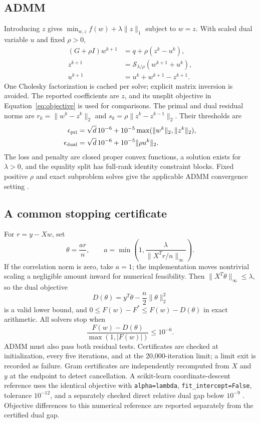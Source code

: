 \documentclass{article}
\newcommand{\soft}{\mathcal{S}}
\begin{document}
\subsection{ADMM}
Introducing $z$ gives $\min_{w,z} f(w)+\lambda\|z\|_1$ subject to $w=z$. With scaled dual variable $u$ and fixed $\rho>0$,
\begin{align}
 (G+\rho I)w^{k+1}&=q+\rho(z^k-u^k),\\
 z^{k+1}&=\soft_{\lambda/\rho}(w^{k+1}+u^k),\\
 u^{k+1}&=u^k+w^{k+1}-z^{k+1}.
\end{align}
One Cholesky factorization is cached per solve; explicit matrix inversion is avoided. The reported coefficients are $z$, and its unsplit objective in Equation~\ref{eq:objective} is used for comparisons. The primal and dual residual norms are
$r_k=\|w^k-z^k\|_2$ and $s_k=\rho\|z^k-z^{k-1}\|_2$.
Their thresholds are
\begin{align}
 \epsilon_{\rm pri}&=\sqrt{d}\,10^{-6}+10^{-5}\max(\|w^k\|_2,\|z^k\|_2),\\
 \epsilon_{\rm dual}&=\sqrt{d}\,10^{-6}+10^{-5}\|\rho u^k\|_2.
\end{align}
The loss and penalty are closed proper convex functions, a solution exists for $\lambda>0$, and the equality split has full-rank identity constraint blocks. Fixed positive $\rho$ and exact subproblem solves give the applicable ADMM convergence setting \citep{boyd2011}.

\subsection{A common stopping certificate}
For $r=y-Xw$, set
\begin{equation}
 \theta=\frac{a r}{n},\qquad
 a=\min\left(1,\frac{\lambda}{\|X^Tr/n\|_\infty}\right).
\end{equation}
If the correlation norm is zero, take $a=1$; the implementation moves nontrivial scaling a negligible amount inward for numerical feasibility. Then $\|X^T\theta\|_\infty\leq\lambda$, so the dual objective
\begin{equation}
 D(\theta)=y^T\theta-\frac{n}{2}\|\theta\|_2^2
\end{equation}
is a valid lower bound, and $0\leq F(w)-F^*\leq F(w)-D(\theta)$ in exact arithmetic. All solvers stop when
\begin{equation}
 \frac{F(w)-D(\theta)}{\max(1,|F(w)|)}\leq10^{-6}.
 \label{eq:stopping}
\end{equation}
ADMM must also pass both residual tests. Certificates are checked at initialization, every five iterations, and at the 20,000-iteration limit; a limit exit is recorded as failure. Gram certificates are independently recomputed from $X$ and $y$ at the endpoint to detect cancellation. A scikit-learn coordinate-descent reference uses the identical objective with \texttt{alpha=lambda}, \texttt{fit\_intercept=False}, tolerance $10^{-12}$, and a separately checked direct relative dual gap below $10^{-9}$ \citep{sklearnlasso}. Objective differences to this numerical reference are reported separately from the certified dual gap.
\end{document}
